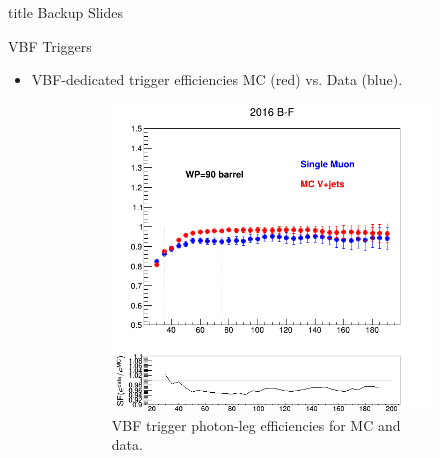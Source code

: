 \documentclass[9pt,aspectratio=1610]{beamer}
\begin{document}
\begin{frame}
	\label{sec:backup}
	\vfill
	\centering
	\begin{beamercolorbox}[sep=8pt,center,shadow=false,rounded=true]{title}
		\Huge Backup Slides \par%
	\end{beamercolorbox}
	\vfill
\end{frame}

\begin{frame}{VBF Triggers}
	\begin{itemize}
		\item VBF-dedicated trigger efficiencies MC (red) vs. Data (blue).\\
		\vspace{1em}	
		\begin{figure}
			\centering
			\begin{subfigure}[t]{0.31\linewidth}
				\includegraphics[width=\textwidth]{figures/misc/PhotonFromData_RhoCat12016_WP90_barrel.png}
				\caption{VBF trigger photon-leg efficiencies for MC and data.}
			\end{subfigure}%
			\hfill
			\begin{subfigure}[t]{0.31\linewidth}

\end{subfigure}
\end{figure}
\end{itemize}
\end{frame}
\end{document}
